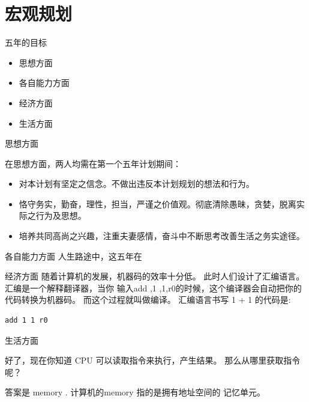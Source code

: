 \documentclass[10pt]{beamer}
\begin{document}
\section{宏观规划}

\begin{frame}[fragile]{五年的目标}
\begin{itemize}
	\item 思想方面
	\item 各自能力方面
	\item 经济方面
	\item 生活方面
\end{itemize}

\end{frame}

\begin{frame}[fragile]{思想方面 }

在思想方面，两人均需在第一个五年计划期间：
\begin{itemize}
\item 对本计划有坚定之信念。不做出违反本计划规划的想法和行为。
\item 恪守务实，勤奋，理性，担当，严谨之价值观。彻底清除愚昧，贪婪，脱离实际之行为及思想。
\item 培养共同高尚之兴趣，注重夫妻感情，奋斗中不断思考改善生活之务实途径。
\end{itemize}

\end{frame}


\begin{frame}[fragile]{各自能力方面 }
	人生路途中，这五年在
\end{frame}

\begin{frame}[fragile]{经济方面 }
随着计算机的发展，机器码的效率十分低。 此时人们设计了汇编语言。汇编是一个解释翻译器，当你
输入add ,1 ,1,r0的时候，这个编译器会自动把你的代码转换为机器码。 而这个过程就叫做编译。
汇编语言书写 1 + 1 的代码是:
\begin{lstlisting}
add 1 1 r0
\end{lstlisting}

\end{frame}


\begin{frame}[fragile]{生活方面 }

好了，现在你知道 CPU 可以读取指令来执行，产生结果。
那么从哪里获取指令呢？

答案是 memory .  计算机的memory 指的是拥有地址空间的
记忆单元。
\end{frame}
\end{document}

